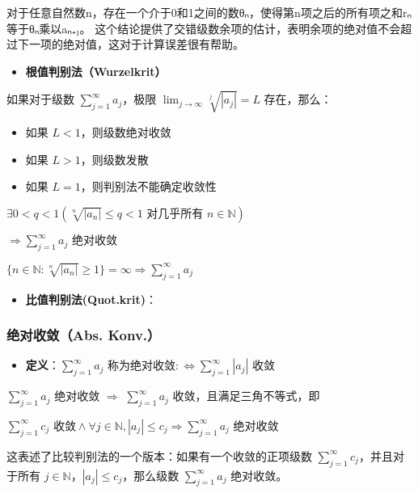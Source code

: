 \documentclass[a4paper,12pt]{article}
\providecommand{\tightlist}{\setlength{\itemsep}{0pt}\setlength{\parskip}{0pt}}
\begin{document}
对于任意自然数n，存在一个介于0和1之间的数θₙ，使得第n项之后的所有项之和rₙ等于θₙ乘以aₙ₊₁。
这个结论提供了交错级数余项的估计，表明余项的绝对值不会超过下一项的绝对值，这对于计算误差很有帮助。

\begin{itemize}
\tightlist
\item
  \textbf{根值判别法（Wurzelkrit）}
\end{itemize}

如果对于级数 \(\sum_{j=1}^{\infty} a_j\)，极限
\(\lim_{j \to \infty} \sqrt[j]{|a_j|} = L\) 存在，那么：

\begin{itemize}
\tightlist
\item
  如果 \(L < 1\)，则级数绝对收敛
\item
  如果 \(L > 1\)，则级数发散
\item
  如果 \(L = 1\)，则判别法不能确定收敛性
\end{itemize}

\(\exists 0<q<1 \left(\sqrt[n]{|a_n|} \leq q < 1 \text{ 对几乎所有 } n \in \mathbb{N}\right)\)

\(\Rightarrow \sum_{j=1}^{\infty} a_j \text{ 绝对收敛}\)

\(\{n \in \mathbb{N} : \sqrt[n]{|a_n|} \geq 1\} = \infty \Rightarrow \sum_{j=1}^{\infty} a_j\)

\begin{itemize}
\tightlist
\item
  \textbf{比值判别法(Quot.krit)}：
\end{itemize}

\subsubsection{绝对收敛（Abs.
Konv.）}\label{ux7eddux5bf9ux6536ux655babs.-konv.}

\begin{itemize}
\tightlist
\item
  \textbf{定义}：\(\sum_{j=1}^{\infty} a_j \text{ 称为绝对收敛} :\Leftrightarrow \sum_{j=1}^{\infty} |a_j| \text{ 收敛}\)
\end{itemize}

\(\sum_{j=1}^{\infty} a_j\) 绝对收敛 \(\Rightarrow\)
\(\sum_{j=1}^{\infty} a_j\) 收敛，且满足三角不等式，即

\(\sum_{j=1}^{\infty} c_j \text{ 收敛} \wedge \forall j \in \mathbb{N}, |a_j| \leq c_j \Rightarrow \sum_{j=1}^{\infty} a_j \text{ 绝对收敛}\)

这表述了比较判别法的一个版本：如果有一个收敛的正项级数
\(\sum_{j=1}^{\infty} c_j\)，并且对于所有
\(j \in \mathbb{N}\)，\(|a_j| \leq c_j\)，那么级数
\(\sum_{j=1}^{\infty} a_j\) 绝对收敛。
\end{document}
